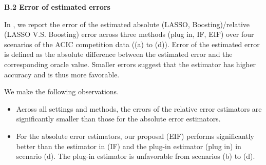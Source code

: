 \textbf{B.2 Error of estimated errors}

In , we report the error of the estimated absolute (LASSO, Boosting)/relative (LASSO V.S. Boosting) error across three methods (plug in, IF, EIF) over four scenarios of the ACIC competition data ((a) to (d)). 
Error of the estimated error is defined as the absolute difference between the estimated error and the corresponding oracle value.
Smaller errors suggest that the estimator has higher accuracy and is thus more favorable.


We make the following observations.
\begin{itemize}
    \item Across all settings and methods, the errors of the relative error estimators are significantly smaller than those for the absolute error estimators.
    \item For the absolute error estimators, our proposal (EIF) performs significantly better than the estimator in \cite{alaa2019validating} (IF) and the plug-in estimator (plug in) in scenario (d). The plug-in estimator is unfavorable from scenarios (b) to (d).
\end{itemize}


